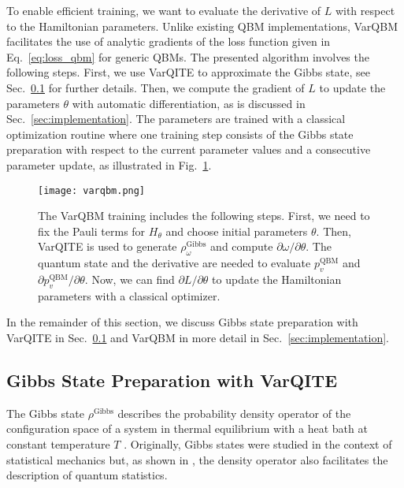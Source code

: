 \documentclass[twocolumn, aps, pra, superscriptaddress, floatfix]{revtex4}
\newcommand{\varqbm}{VarQBM}
\begin{document}
To enable efficient training, we want to evaluate the derivative of $L$ with respect to the Hamiltonian parameters. Unlike existing QBM implementations, \varqbm{} facilitates the use of analytic gradients of the loss function given in Eq.~\eqref{eq:loss_qbm} for generic QBMs.
The presented algorithm involves the following steps.
First, we use VarQITE to approximate the Gibbs state, see Sec.~\ref{sec:gibbsVarQITE} for further details. 
Then, we compute the gradient of $L$  to update the parameters $\theta$ with automatic differentiation, as is discussed in Sec.~\ref{sec:implementation}. The parameters are trained with a classical optimization routine where one training step consists of the Gibbs state preparation with respect to the current parameter values and a consecutive parameter update, as illustrated in Fig.~\ref{fig:varqbm}.
\begin{figure}[h!]
\captionsetup{singlelinecheck = false, format= hang, justification=raggedright, font=footnotesize, labelsep=space}
\begin{center}
\texttt{[image: varqbm.png]}
\end{center}
\caption{The \varqbm{} training includes the following steps. First, we need to fix the Pauli terms for $H_{\theta}$ and choose initial parameters $\theta$. Then, VarQITE is used to generate $\rho_{\omega}^{\text{Gibbs}}$ and compute $\partial\omega/ \partial\theta$. 
The quantum state and the derivative are needed to evaluate $p_v^{\text{QBM}}$ and $\partial p_v^{\text{QBM}}/\partial\theta$. Now, we can find $\partial L/\partial\theta$ to update the Hamiltonian parameters with a classical optimizer.}
\label{fig:varqbm}
\end{figure}

In the remainder of this section, we discuss Gibbs state preparation with VarQITE in Sec.~\ref{sec:gibbsVarQITE} and VarQBM in more detail in Sec.~\ref{sec:implementation}.

\subsection{Gibbs State Preparation with VarQITE}
\label{sec:gibbsVarQITE}

The Gibbs state $\rho^{\text{Gibbs}}$ describes the probability density operator of the configuration space of a system in thermal equilibrium with a heat bath at constant temperature $T$ \cite{gibbs_2010}. Originally, Gibbs states were studied in the context of statistical mechanics but, as shown in \cite{Pauli1927}, the density operator also facilitates the description of quantum statistics.
 
\end{document}
